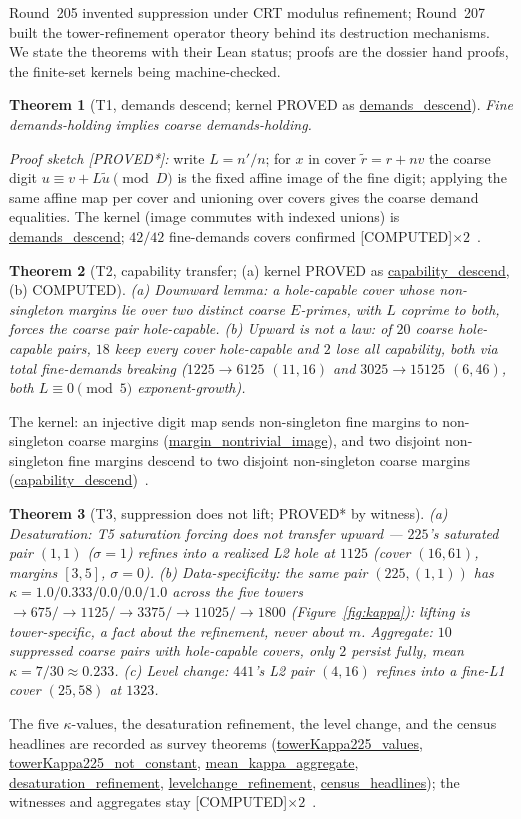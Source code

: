 \documentclass[11pt,a4paper]{article}
\newtheorem{theorem}{Theorem}
\theoremstyle{definition}
\begin{document}
Round~205 invented suppression under CRT modulus refinement; Round~207
built the tower-refinement operator theory behind its destruction
mechanisms. We state the theorems with their Lean status; proofs are the
dossier hand proofs, the finite-set kernels being machine-checked.

\begin{theorem}[T1, demands descend; kernel PROVED as
  \url{demands_descend}]
  \label{thm:t1}
  Fine demands-holding implies coarse demands-holding.
\end{theorem}
\emph{Proof sketch [PROVED*]:} write $L=n'/n$; for $x$ in cover
$\tilde r=r+nv$ the coarse digit $u\equiv v+L\tilde u\pmod D$ is the fixed
affine image of the fine digit; applying the same affine map per cover
and unioning over covers gives the coarse demand equalities. The kernel
(image commutes with indexed unions) is \url{demands_descend};
$42/42$ fine-demands covers confirmed [COMPUTED]$\times2$~\cite{D205}.

\begin{theorem}[T2, capability transfer; (a) kernel PROVED as
  \url{capability_descend}, (b) COMPUTED]
  \label{thm:t2}
  (a) \emph{Downward lemma:} a hole-capable cover whose non-singleton
  margins lie over two distinct coarse $E$-primes, with $L$ coprime to
  both, forces the coarse pair hole-capable. (b) \emph{Upward is not a
  law:} of $20$ coarse hole-capable pairs, $18$ keep every cover
  hole-capable and $2$ lose all capability, both via total fine-demands
  breaking ($1225\to6125$ $(11,16)$ and $3025\to15125$ $(6,46)$, both
  $L\equiv0\pmod5$ exponent-growth).
\end{theorem}
The kernel: an injective digit map sends non-singleton fine margins to
non-singleton coarse margins (\url{margin_nontrivial_image}), and
two disjoint non-singleton fine margins descend to two disjoint
non-singleton coarse margins (\url{capability_descend})~\cite{D210}.

\begin{theorem}[T3, suppression does not lift; PROVED* by witness]
  (a) \emph{Desaturation:} T5 saturation forcing does not transfer
  upward --- $225$'s saturated pair $(1,1)$ ($\sigma=1$) refines into a
  realized L2 hole at $1125$ (cover $(16,61)$, margins $[3,5]$,
  $\sigma=0$). (b) \emph{Data-specificity:} the same pair $(225,(1,1))$
  has $\kappa=1.0/0.333/0.0/0.0/1.0$ across the five towers
  $\to675/\to1125/\to3375/\to11025/\to1800$ (Figure~\ref{fig:kappa}):
  lifting is tower-specific, a fact about the refinement, never about
  $m$. Aggregate: $10$ suppressed coarse pairs with hole-capable covers,
  only $2$ persist fully, mean $\kappa=7/30\approx0.233$. (c)
  \emph{Level change:} $441$'s L2 pair $(4,16)$ refines into a fine-L1
  cover $(25,58)$ at $1323$.
\end{theorem}
The five $\kappa$-values, the desaturation refinement, the level change,
and the census headlines are recorded as survey theorems
(\url{towerKappa225_values},
\url{towerKappa225_not_constant}, \url{mean_kappa_aggregate},
\url{desaturation_refinement}, \url{levelchange_refinement},
\url{census_headlines}); the witnesses and aggregates stay
[COMPUTED]$\times2$~\cite{D205,D210}.
\end{document}

